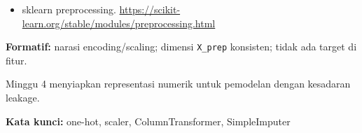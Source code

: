 \documentclass[../main.tex]{subfiles}
\begin{document}
\begin{itemize}[leftmargin=*]
  \item sklearn preprocessing. \url{https://scikit-learn.org/stable/modules/preprocessing.html}
\end{itemize}

\begin{asesmen}
\textbf{Formatif:} narasi encoding/scaling; dimensi \texttt{X\_prep} konsisten; tidak ada target di fitur.
\end{asesmen}

\begin{rangkuman}
Minggu 4 menyiapkan representasi numerik untuk pemodelan dengan kesadaran leakage.

\textbf{Kata kunci:} one-hot, scaler, ColumnTransformer, SimpleImputer
\end{rangkuman}
\end{document}

